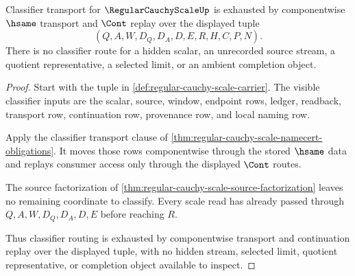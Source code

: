\begin{theorem}
\label{thm:regular-cauchy-scale-classifier-route-exhaustion}
Classifier transport for $\RegularCauchyScaleUp$ is exhausted by componentwise $\hsame$ transport and $\Cont$ replay over the displayed tuple
$$
(Q,A,W,D_Q,D_A,D,E,R,H,C,P,N).
$$
There is no classifier route for a hidden scalar, an unrecorded source stream, a quotient representative, a selected limit, or an ambient completion object.
\end{theorem}
\begin{proof}
Start with the tuple in \autoref{def:regular-cauchy-scale-carrier}. The visible classifier inputs are the scalar, source, window, endpoint rows, ledger, readback, transport row, continuation row, provenance row, and local naming row.

Apply the classifier transport clause of \autoref{thm:regular-cauchy-scale-namecert-obligations}. It moves those rows componentwise through the stored $\hsame$ data and replays consumer access only through the displayed $\Cont$ routes.

The source factorization of \autoref{thm:regular-cauchy-scale-source-factorization} leaves no remaining coordinate to classify. Every scale read has already passed through $Q,A,W,D_Q,D_A,D,E$ before reaching $R$.

Thus classifier routing is exhausted by componentwise transport and continuation replay over the displayed tuple, with no hidden stream, selected limit, quotient representative, or completion object available to inspect.
\end{proof}

